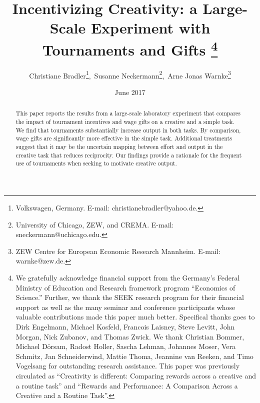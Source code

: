 \documentclass[a4paper,12pt]{article}
\begin{document}
\begin{titlepage}

\title{Incentivizing Creativity: a Large-Scale Experiment with Tournaments and Gifts 
\footnote{We gratefully acknowledge financial support from the Germany's Federal Ministry of Education and Research framework program ``Economics of Science.'' Further, we thank the SEEK research program for their financial support as well as the many seminar and conference participants whose valuable contributions made this paper much better. Specifical thanks goes to Dirk Engelmann, Michael Kosfeld, Francois Laisney, Steve Levitt, John Morgan,  Nick Zubanov, and Thomas Zwick. We thank Christian Bommer, Michael D\"orsam, Radost Holler, Sascha Lehman, Johannes Moser, Vera Schmitz, Jan Schneiderwind, Mattie Thoma, Jeannine van Reeken, and Timo Vogelsang for outstanding research assistance. This paper was previously circulated as ``Creativity is different: Comparing rewards across a creative and a routine task'' and ``Rewards and Performance:
A Comparison Across a Creative and a Routine Task''.}}
\author{Christiane Bradler\footnote{Volkswagen, Germany. E-mail: christianebradler@yahoo.de.},\ Susanne Neckermann\footnote{University of Chicago, ZEW, and CREMA. E-mail: sneckermann@uchicago.edu.},\ Arne Jonas Warnke\footnote{ZEW Centre for European Economic Research Mannheim. E-mail: warnke@zew.de.}}
\date{June 2017}
\maketitle
\thispagestyle{empty}

\begin{abstract}
\noindent
This paper reports the results from a large-scale laboratory experiment that compares 
 the impact of tournament incentives and wage gifts on a creative and a simple task. 
We find that tournaments substantially increase output in both tasks. By comparison,
wage gifts are significantly more effective in the simple task. Additional treatments suggest that it may be
the uncertain mapping between effort and output in the creative task that reduces 
reciprocity. 
Our findings provide a rationale for the frequent use of tournaments when seeking to motivate creative output. 


\end{abstract}


\end{titlepage}
\end{document}
